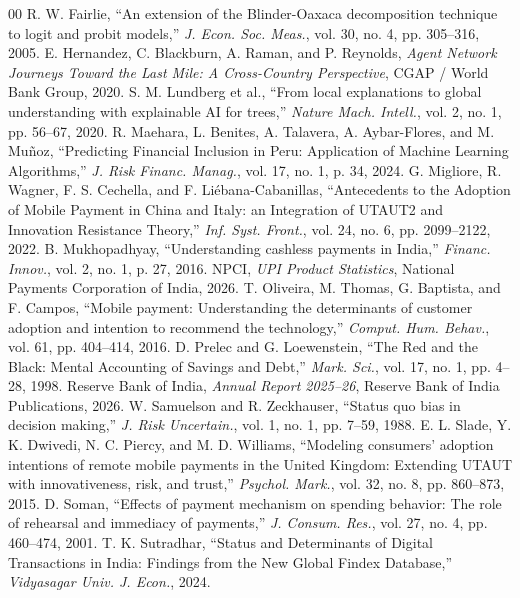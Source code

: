 \documentclass[conference]{IEEEtran}
\begin{document}
\begin{thebibliography}{00}
 R. W. Fairlie, ``An extension of the Blinder-Oaxaca decomposition technique to logit and probit models,'' \textit{J. Econ. Soc. Meas.}, vol. 30, no. 4, pp. 305--316, 2005.
 E. Hernandez, C. Blackburn, A. Raman, and P. Reynolds, \textit{Agent Network Journeys Toward the Last Mile: A Cross-Country Perspective}, CGAP / World Bank Group, 2020.
 S. M. Lundberg et al., ``From local explanations to global understanding with explainable AI for trees,'' \textit{Nature Mach. Intell.}, vol. 2, no. 1, pp. 56--67, 2020.
 R. Maehara, L. Benites, A. Talavera, A. Aybar-Flores, and M. Mu{\~n}oz, ``Predicting Financial Inclusion in Peru: Application of Machine Learning Algorithms,'' \textit{J. Risk Financ. Manag.}, vol. 17, no. 1, p. 34, 2024.
 G. Migliore, R. Wagner, F. S. Cechella, and F. Li{\'e}bana-Cabanillas, ``Antecedents to the Adoption of Mobile Payment in China and Italy: an Integration of UTAUT2 and Innovation Resistance Theory,'' \textit{Inf. Syst. Front.}, vol. 24, no. 6, pp. 2099--2122, 2022.
 B. Mukhopadhyay, ``Understanding cashless payments in India,'' \textit{Financ. Innov.}, vol. 2, no. 1, p. 27, 2016.
 NPCI, \textit{UPI Product Statistics}, National Payments Corporation of India, 2026.
 T. Oliveira, M. Thomas, G. Baptista, and F. Campos, ``Mobile payment: Understanding the determinants of customer adoption and intention to recommend the technology,'' \textit{Comput. Hum. Behav.}, vol. 61, pp. 404--414, 2016.
 D. Prelec and G. Loewenstein, ``The Red and the Black: Mental Accounting of Savings and Debt,'' \textit{Mark. Sci.}, vol. 17, no. 1, pp. 4--28, 1998.
 Reserve Bank of India, \textit{Annual Report 2025--26}, Reserve Bank of India Publications, 2026.
 W. Samuelson and R. Zeckhauser, ``Status quo bias in decision making,'' \textit{J. Risk Uncertain.}, vol. 1, no. 1, pp. 7--59, 1988.
 E. L. Slade, Y. K. Dwivedi, N. C. Piercy, and M. D. Williams, ``Modeling consumers' adoption intentions of remote mobile payments in the United Kingdom: Extending UTAUT with innovativeness, risk, and trust,'' \textit{Psychol. Mark.}, vol. 32, no. 8, pp. 860--873, 2015.
 D. Soman, ``Effects of payment mechanism on spending behavior: The role of rehearsal and immediacy of payments,'' \textit{J. Consum. Res.}, vol. 27, no. 4, pp. 460--474, 2001.
 T. K. Sutradhar, ``Status and Determinants of Digital Transactions in India: Findings from the New Global Findex Database,'' \textit{Vidyasagar Univ. J. Econ.}, 2024.

\end{thebibliography}
\end{document}
